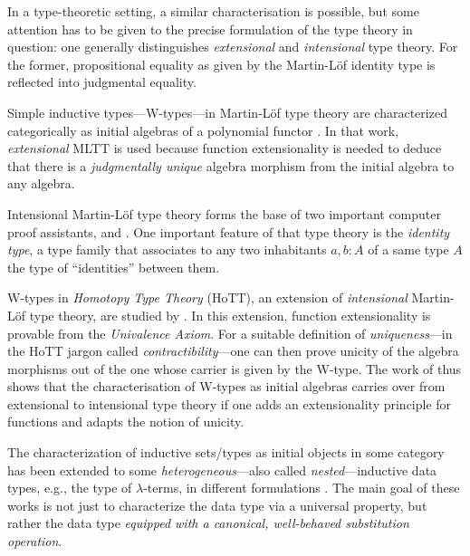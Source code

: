 \documentclass{amsart}
\begin{document}
 In a type-theoretic setting, a similar characterisation is possible, but some attention has to be given to 
 the precise formulation of the type theory in question:
 one generally distinguishes \emph{extensional} and \emph{intensional} type theory.
 For the former, propositional equality as given by the Martin-L\"of identity type \parencite{martin_lof} is reflected 
 into judgmental equality.

 Simple inductive types---\textsf{W}-types---in Martin-L\"of type theory are characterized categorically as initial algebras of
 a polynomial functor \parencite{DBLP:journals/tcs/Dybjer97}. In that work, \emph{extensional} MLTT is used
 because function extensionality is needed to deduce that there is a \emph{judgmentally unique} algebra morphism from the initial algebra to any algebra.
 
 Intensional Martin-L\"of type theory \parencite{martin_lof} forms the base of two important computer proof assistants, \coq and \agda.
 One important feature of that type theory is the \emph{identity type}, a type family that associates to any two 
 inhabitants $a,b : A$ of a same type $A$ the type of \enquote{identities} between them.
 
 
 \textsf{W}-types in \emph{Homotopy Type Theory} (HoTT), an extension of \emph{intensional} Martin-L\"of type theory, are studied by \textcite{DBLP:conf/lics/AwodeyGS12}.
 In this extension, function extensionality is provable from the \emph{Univalence Axiom}. 
 For a suitable definition of \emph{uniqueness}---in the HoTT jargon called \emph{contractibility}---one can then prove unicity of the
 algebra morphisms out of the one whose carrier is given by the \textsf{W}-type.
 The work of \textcite{DBLP:conf/lics/AwodeyGS12} thus shows that the characterisation of \textsf{W}-types as initial algebras carries over 
 from extensional to intensional type theory if one adds an extensionality principle for functions and adapts the notion of unicity.
 
 
 The characterization of inductive sets/types as initial objects in some category
 has been extended to some \emph{heterogeneous}---also called \emph{nested}---inductive data types, e.g., the type of $\lambda$-terms,
 in different formulations \parencite{fpt, DBLP:journals/iandc/HirschowitzM10}.
 The main goal of these works is not just to characterize the data type via a universal property, but rather the data type
 \emph{equipped with a canonical, well-behaved substitution operation}.
 
\end{document}
